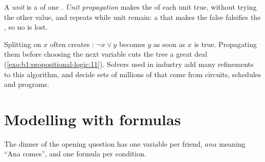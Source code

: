 \begin{definition}\label{def:b1:propositional-logic:unit}
A \emph{unit } is a  of one . \emph{Unit propagation} makes the  of
each unit  true, without trying the other value, and repeats while unit  remain: a  that makes
the  false falsifies the , so no  is lost.
\end{definition}

Splitting on $x$ often creates : $\neg x \vee y$ becomes $y$ as soon as $x$ is true. Propagating them before
choosing the next variable cuts the tree a great deal (\cref{exo:b1:propositional-logic:11}). Solvers used in industry
add many refinements to this algorithm, and decide sets of millions of  that come from circuits, schedules and
programs.

\section{Modelling with formulas}\label{sec:b1:propositional-logic:modelling}

The dinner of the opening question has one variable per friend, $\mathit{ana}$ meaning ``Ana comes'', and one formula
per condition.

\label{lst:b1:propositional-logic:puzzle}

\label{out:b1:propositional-logic:puzzle}


